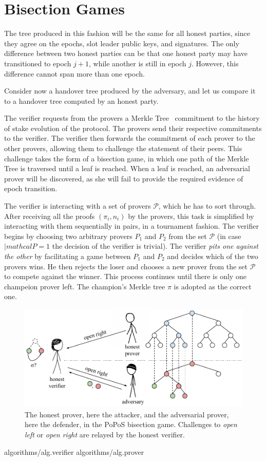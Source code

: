 \section{Bisection Games}

The tree produced in this fashion will be the same for all honest parties, since they agree on
the epochs, slot leader public keys, and signatures. The only difference between two honest parties
can be that one honest party may have transitioned to epoch $j+1$, while another is still in epoch
$j$. However, this difference cannot span more than one epoch.

Consider now a handover tree produced by the adversary, and let us compare it to a handover tree
computed by an honest party. 

The verifier requests from
the provers a Merkle Tree~\cite{merkle} commitment to the history of stake evolution of
the protocol. The provers send their respective commitments to the verifier. The verifier
then forwards the commitment of each prover to the other provers, allowing them to
challenge the statement of their peers. This challenge takes the form of a bisection
game, in which one path of the Merkle Tree is traversed until a leaf is reached.
When a leaf is reached, an adversarial prover will be discovered, as she will fail to provide
the required evidence of epoch transition. 

The verifier is interacting with a set of provers $\mathcal{P}$, which he has to sort through.
After receiving all the proofs $(\pi_i, n_i)$ by the provers,
this task is simplified by interacting with them sequentially in pairs,
in a tournament fashion. The verifier
begins by choosing two arbitrary provers $P_1$ and $P_2$ from the set $\mathcal{P}$
(in case $|mathcal{P} = 1$ the decision of the verifier is trivial). The
verifier \emph{pits one against the other} by facilitating a game between
$P_1$ and $P_2$ and decides which of the
two provers wins. He then rejects the loser and chooses a new prover from the
set $\mathcal{P}$ to compete against the winner. This process continues until
there is only one champeion prover left. The champion's Merkle tree $\pi$ is adopted
as the correct one.

\begin{figure}[h]
    \centering
    \includegraphics[width=0.55 \textwidth,keepaspectratio]{figures/bisection-game.pdf}
    \caption{The honest prover, here the attacker, and the adversarial prover,
             here the defender, in the PoPoS bisection game. Challenges to \emph{open
             left} or \emph{open right} are relayed by the honest verifier.}
    \label{fig.bisection-game}
\end{figure}

{algorithms/alg.verifier}
{algorithms/alg.prover}

